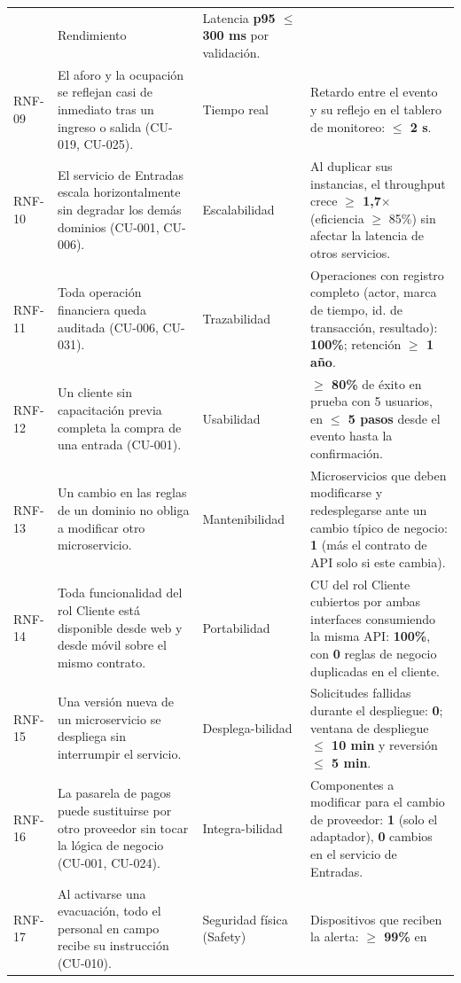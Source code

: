 \begin{center}
\begin{longtable}{p{1.3cm}p{5.2cm}p{2.4cm}p{5.4cm}}
& Rendimiento & Latencia \textbf{p95 $\leq$ 300 ms} por validación.\\[0.3em]
RNF-09 & El aforo y la ocupación se reflejan casi de inmediato tras un ingreso o salida (CU-019,
CU-025). & Tiempo real & Retardo entre el evento y su reflejo en el tablero de monitoreo:
\textbf{$\leq$ 2 s}.\\[0.3em]
RNF-10 & El servicio de Entradas escala horizontalmente sin degradar los demás dominios (CU-001,
CU-006). & Escalabilidad & Al duplicar sus instancias, el throughput crece
\textbf{$\geq$ 1,7$\times$} (eficiencia $\geq$ 85\%) sin afectar la latencia de otros
servicios.\\[0.3em]
RNF-11 & Toda operación financiera queda auditada (CU-006, CU-031). & Trazabilidad & Operaciones
con registro completo (actor, marca de tiempo, id. de transacción, resultado): \textbf{100\%};
retención \textbf{$\geq$ 1 año}.\\[0.3em]
RNF-12 & Un cliente sin capacitación previa completa la compra de una entrada (CU-001).
& Usabilidad & \textbf{$\geq$ 80\%} de éxito en prueba con 5 usuarios, en
\textbf{$\leq$ 5 pasos} desde el evento hasta la confirmación.\\[0.3em]
RNF-13 & Un cambio en las reglas de un dominio no obliga a modificar otro microservicio.
& Mantenibilidad & Microservicios que deben modificarse y redesplegarse ante un cambio típico de
negocio: \textbf{1} (más el contrato de API solo si este cambia).\\[0.3em]
RNF-14 & Toda funcionalidad del rol Cliente está disponible desde web y desde móvil sobre el mismo
contrato. & Portabilidad & CU del rol Cliente cubiertos por ambas interfaces consumiendo la misma
API: \textbf{100\%}, con \textbf{0} reglas de negocio duplicadas en el cliente.\\[0.3em]
RNF-15 & Una versión nueva de un microservicio se despliega sin interrumpir el servicio.
& Desplega-bilidad & Solicitudes fallidas durante el despliegue: \textbf{0}; ventana de despliegue
\textbf{$\leq$ 10 min} y reversión \textbf{$\leq$ 5 min}.\\[0.3em]
RNF-16 & La pasarela de pagos puede sustituirse por otro proveedor sin tocar la lógica de negocio
(CU-001, CU-024). & Integra-bilidad & Componentes a modificar para el cambio de proveedor:
\textbf{1} (solo el adaptador), \textbf{0} cambios en el servicio de Entradas.\\[0.3em]
RNF-17 & Al activarse una evacuación, todo el personal en campo recibe su instrucción (CU-010).
& Seguridad física (Safety) & Dispositivos que reciben la alerta: \textbf{$\geq$ 99\%} en

\end{longtable}
\end{center}
